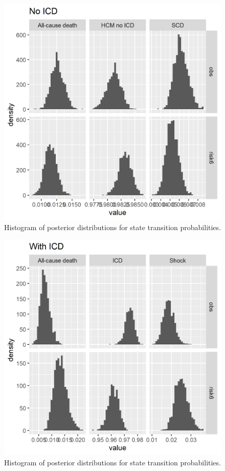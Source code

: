 \documentclass[
]{article}
\begin{document}
\begin{figure}

{\centering \includegraphics[width=0.8\linewidth]{../../images/post_hist_noICD} 

}

\caption{Histogram of posterior distributions for state transition probabilities.}\label{fig:histnoICD}
\end{figure}

\begin{figure}

{\centering \includegraphics[width=0.8\linewidth]{../../images/post_hist_withICD} 

}

\caption{Histogram of posterior distributions for state transition probabilities.}\label{fig:histICD}
\end{figure}
\end{document}
